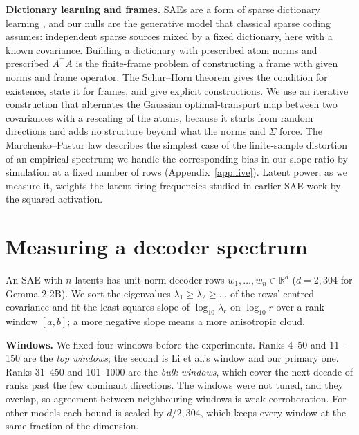 \documentclass[10pt,twocolumn]{article}
\newcommand{\Sig}{\Sigma}
\begin{document}
\textbf{Dictionary learning and frames.} SAEs are a form of sparse dictionary learning \citep{olshausen1996emergence,bricken2023monosemanticity}, and our nulls are the generative model that classical sparse coding assumes: independent sparse sources mixed by a fixed dictionary, here with a known covariance. Building a dictionary with prescribed atom norms and prescribed $A^\top A$ is the finite-frame problem of constructing a frame with given norms and frame operator. The Schur--Horn theorem \citep{horn1954doubly} gives the condition for existence, \citet{antezana2007schurhorn} state it for frames, and \citet{cahill2013constructing} give explicit constructions. We use an iterative construction that alternates the Gaussian optimal-transport map between two covariances \citep{olkin1982distance} with a rescaling of the atoms, because it starts from random directions and adds no structure beyond what the norms and $\Sig$ force. The Marchenko--Pastur law \citep{marchenko1967distribution} describes the simplest case of the finite-sample distortion of an empirical spectrum; we handle the corresponding bias in our slope ratio by simulation at a fixed number of rows (Appendix~\ref{app:live}). Latent power, as we measure it, weights the latent firing frequencies studied in earlier SAE work \citep{bricken2023monosemanticity} by the squared activation.

\section{Measuring a decoder spectrum}
\label{sec:setup}

An SAE with $n$ latents has unit-norm decoder rows $w_1,\dots,w_n \in \mathbb{R}^d$ ($d=2{,}304$ for Gemma-2-2B). We sort the eigenvalues $\lambda_1 \ge \lambda_2 \ge \dots$ of the rows' centred covariance and fit the least-squares slope of $\log_{10}\lambda_r$ on $\log_{10} r$ over a rank window $[a,b]$; a more negative slope means a more anisotropic cloud.

\textbf{Windows.} We fixed four windows before the experiments. Ranks 4--50 and 11--150 are the \emph{top windows}; the second is Li et al.'s window and our primary one. Ranks 31--450 and 101--1000 are the \emph{bulk windows}, which cover the next decade of ranks past the few dominant directions. The windows were not tuned, and they overlap, so agreement between neighbouring windows is weak corroboration. For other models each bound is scaled by $d/2{,}304$, which keeps every window at the same fraction of the dimension.
\end{document}
